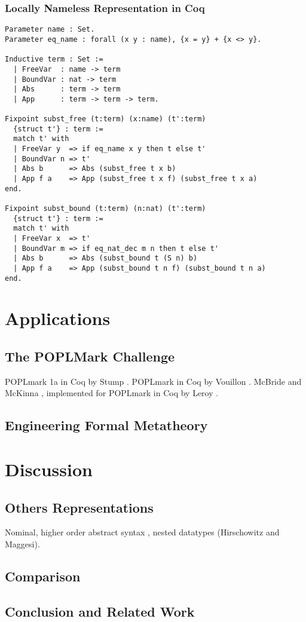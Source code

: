 \documentclass[a4paper,11pt]{article}
\begin{document}
\subsubsection*{Locally Nameless Representation in Coq}

\begin{lstlisting}
Parameter name : Set.
Parameter eq_name : forall (x y : name), {x = y} + {x <> y}.

Inductive term : Set :=
  | FreeVar  : name -> term
  | BoundVar : nat -> term
  | Abs      : term -> term
  | App      : term -> term -> term.

Fixpoint subst_free (t:term) (x:name) (t':term)
  {struct t'} : term :=
  match t' with
  | FreeVar y  => if eq_name x y then t else t'
  | BoundVar n => t'
  | Abs b      => Abs (subst_free t x b)
  | App f a    => App (subst_free t x f) (subst_free t x a)
end.

Fixpoint subst_bound (t:term) (n:nat) (t':term)
  {struct t'} : term :=
  match t' with
  | FreeVar x  => t'
  | BoundVar m => if eq_nat_dec m n then t else t'
  | Abs b      => Abs (subst_bound t (S n) b)
  | App f a    => App (subst_bound t n f) (subst_bound t n a)
end.
\end{lstlisting}


\section{Applications}

\subsection{The POPLMark Challenge}

POPLmark 1a in Coq by Stump \cite{Stump-05}.
POPLmark in Coq by Vouillon \cite{Vouillon-05}.
McBride and McKinna \cite{McBride-McKinna-04}, implemented for POPLmark in Coq by Leroy \cite{Leroy-07}.

\subsection{Engineering Formal Metatheory}


\section{Discussion}\label{sec:discussion}

\subsection{Others Representations}

Nominal, higher order abstract syntax \cite{Capretta-Felty-06}, nested datatypes (Hirschowitz and Maggesi).

\subsection{Comparison}

\subsection{Conclusion and Related Work}


\nocite{*}


\end{document}
